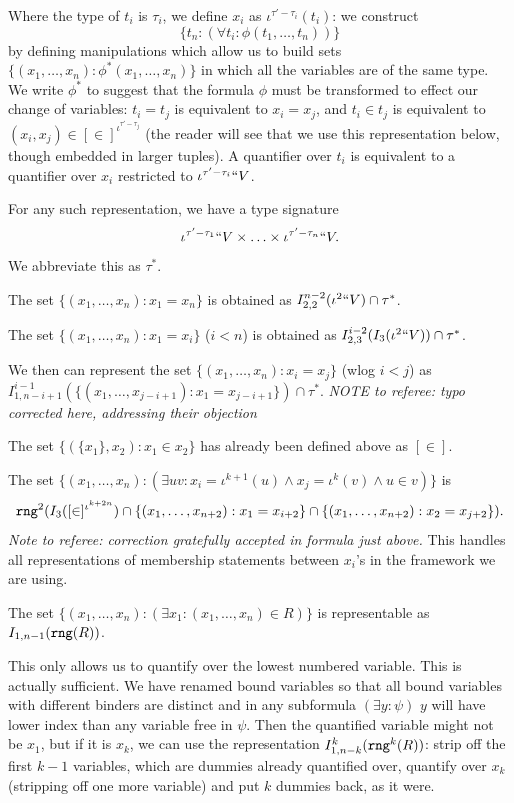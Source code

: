 \documentclass{article}
\theoremstyle{definition}
\theoremstyle{remark}
\begin{document}
{Where the type of $t_i$ is $\tau_i$, we define $x_i$ as $\iota^{\tau'-\tau_i}(t_i)$:  we construct $$\{t_{n}:(\forall t_i:\phi(t_1,\ldots,t_n))\}$$ by defining manipulations which allow us to build sets $\{(x_1,\ldots,x_n):\phi^*(x_1,\ldots,x_n)\}$ in which
all the variables are of the same type.  We write $\phi^*$ to suggest that the formula $\phi$ must be transformed to effect our change of variables:  $t_i = t_j$ is equivalent to $x_i = x_j$, and $t_i \in t_j$ is equivalent to $(x_i,x_j) \in [\in]^{\iota^{\tau'-\tau_j}}$  (the reader will see that we use this representation below, though embedded in larger tuples).  A quantifier over $t_i$ is equivalent to a quantifier over $x_i$ restricted to $\iota^{\tau'-\tau_i}``V$.

For any such representation, we have a type signature $$\iota^{\tau'-\tau_1}``V \times \ldots \times \iota^{\tau'-\tau_n}``V.$$  We abbreviate this as $\tau^*$.

The set $\{(x_1,\ldots,x_n):x_1 = x_n\}$ is obtained as $I_{2,2}^{n-2}(\iota^2``V)\cap \tau^*$.

The set $\{(x_1,\dots,x_n):x_1 = x_i\}$ ($i<n$) is obtained as $I_{2,3}^{i-2}(I_3(\iota^2``V))\cap \tau^*$.

We then can represent the
set $\{(x_1,\ldots,x_n):x_i = x_j\}$ (wlog $i<j$) as \newline $I_{1,n-i+1}^{i-1}(\{(x_1,\ldots,x_{j-i+1}):x_1 = x_{j-i+1}\})\cap \tau^*$.  {\em NOTE to referee:  typo corrected here, addressing their objection}

The set $\{(\{x_1\},x_2):x_1 \in x_2\}$ has already been defined above as $[\in]$.

The set $\{(x_1,\ldots,x_n):(\exists uv:x_i = \iota^{k+1}(u) \wedge x_j = \iota^k(v) \wedge u\in v)\}$ is
$${\tt rng}^2(I_3([\in]^{\iota^{k+2n}}) \cap \{(x_1,\ldots,x_{n+2}):x_1 = x_{i+2}\} \cap \{(x_1,\ldots,x_{n+2}):x_2=x_{j+2}\}).$$    {\em Note to referee:  correction gratefully accepted in formula just above.} This
handles all representations of membership statements between $x_i$'s  in the framework we are using.

The set $\{(x_1,\ldots,x_n):(\exists x_1:(x_1,\ldots,x_n)\in R)\}$ is representable as $I_{1,n-1}({\tt rng}(R))$.

This only allows us to quantify over the lowest numbered variable.  This is actually sufficient.  We have renamed bound variables so that all bound variables with different binders are distinct
and in any subformula $(\exists y:\psi)$ $y$ will have lower index than any variable  free in $\psi$.  Then the quantified variable might not be $x_1$, but if it is $x_k$,
we can use the representation $I^{k}_{1,n-k}({\tt rng}^k(R))$:  strip off the first $k-1$ variables, which are dummies already quantified over,
quantify over $x_k$ (stripping off one more variable) and put $k$ dummies back, as it were.

}
\end{document}
